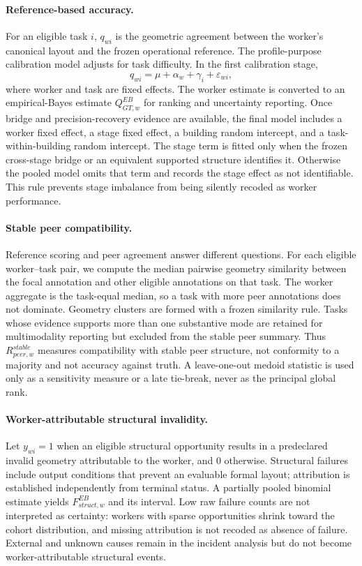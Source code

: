 \paragraph{Reference-based accuracy.}
For an eligible task $i$, $q_{wi}$ is the geometric agreement between the worker's canonical layout and the frozen operational reference. The profile-purpose calibration model adjusts for task difficulty. In the first calibration stage,
\begin{equation}
  q_{wi}=\mu+\alpha_w+\gamma_i+\varepsilon_{wi},
  \label{eq:qgtc1}
\end{equation}
where worker and task are fixed effects. The worker estimate is converted to an empirical-Bayes estimate $Q_{GT,w}^{EB}$ for ranking and uncertainty reporting. Once bridge and precision-recovery evidence are available, the final model includes a worker fixed effect, a stage fixed effect, a building random intercept, and a task-within-building random intercept. The stage term is fitted only when the frozen cross-stage bridge or an equivalent supported structure identifies it. Otherwise the pooled model omits that term and records the stage effect as not identifiable. This rule prevents stage imbalance from being silently recoded as worker performance.

\paragraph{Stable peer compatibility.}
Reference scoring and peer agreement answer different questions. For each eligible worker--task pair, we compute the median pairwise geometry similarity between the focal annotation and other eligible annotations on that task. The worker aggregate is the task-equal median, so a task with more peer annotations does not dominate. Geometry clusters are formed with a frozen similarity rule. Tasks whose evidence supports more than one substantive mode are retained for multimodality reporting but excluded from the stable peer summary. Thus $R_{peer,w}^{stable}$ measures compatibility with stable peer structure, not conformity to a majority and not accuracy against truth. A leave-one-out medoid statistic is used only as a sensitivity measure or a late tie-break, never as the principal global rank.

\paragraph{Worker-attributable structural invalidity.}
Let $y_{wi}=1$ when an eligible structural opportunity results in a predeclared invalid geometry attributable to the worker, and $0$ otherwise. Structural failures include output conditions that prevent an evaluable formal layout; attribution is established independently from terminal status. A partially pooled binomial estimate yields $F_{struct,w}^{EB}$ and its interval. Low raw failure counts are not interpreted as certainty: workers with sparse opportunities shrink toward the cohort distribution, and missing attribution is not recoded as absence of failure. External and unknown causes remain in the incident analysis but do not become worker-attributable structural events.

